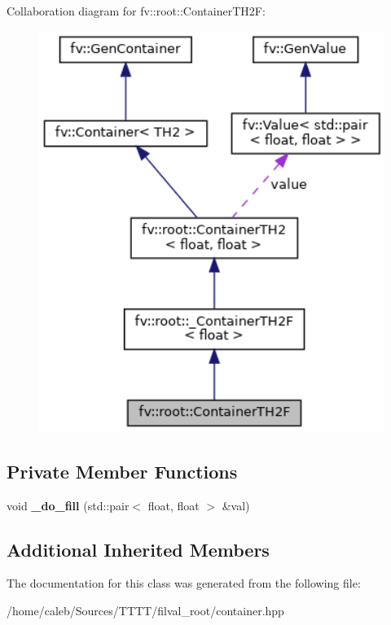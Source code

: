Collaboration diagram for fv\+:\+:root\+:\+:Container\+T\+H2F\+:
\nopagebreak
\begin{figure}[H]
\begin{center}
\leavevmode
\includegraphics[width=330pt]{classfv_1_1root_1_1ContainerTH2F__coll__graph}
\end{center}
\end{figure}
\subsection*{Private Member Functions}
\begin{DoxyCompactItemize}
\item 
\hypertarget{classfv_1_1root_1_1ContainerTH2F_a47270db4e46873e22915dd0281c1d669}{}\label{classfv_1_1root_1_1ContainerTH2F_a47270db4e46873e22915dd0281c1d669} 
void {\bfseries \+\_\+do\+\_\+fill} (std\+::pair$<$ float, float $>$ \&val)
\end{DoxyCompactItemize}
\subsection*{Additional Inherited Members}


The documentation for this class was generated from the following file\+:\begin{DoxyCompactItemize}
\item 
/home/caleb/\+Sources/\+T\+T\+T\+T/filval\+\_\+root/container.\+hpp\end{DoxyCompactItemize}
